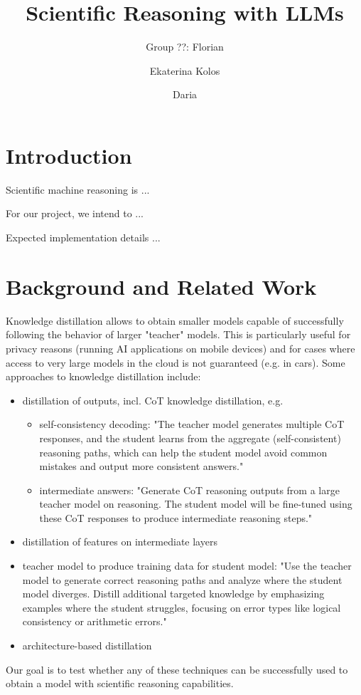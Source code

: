 \documentclass{article}
\begin{document}
\title{Scientific Reasoning with LLMs}

\author{Group ??: Florian \and Ekaterina Kolos \and Daria }

\maketitle             


\section{Introduction}

Scientific machine reasoning is ... 

For our project, we intend to ...

Expected implementation details ...

\section{Background and Related Work}

Knowledge distillation allows to obtain smaller models capable of successfully following the behavior of larger "teacher" models. This is particularly useful for privacy reasons (running AI applications on mobile devices) and for cases where access to very large models in the cloud is not guaranteed (e.g. in cars). Some approaches to knowledge distillation include: \begin{itemize}
    \item distillation of outputs, incl. CoT knowledge distillation, e.g. 
    \begin{itemize}
    \item self-consistency decoding: "The teacher model generates multiple CoT responses, and the student learns from the aggregate (self-consistent) reasoning paths, which can help the student model avoid common mistakes and output more consistent answers." 
    \item intermediate answers: "Generate CoT reasoning outputs from a large teacher model on reasoning. The student model will be fine-tuned using these CoT responses to produce intermediate reasoning steps."
    \end{itemize}
    \item distillation of features on intermediate layers 
    \item teacher model to produce training data for student model: "Use the teacher model to generate correct reasoning paths and analyze where the student model diverges. Distill additional targeted knowledge by emphasizing examples where the student struggles, focusing on error types like logical consistency or arithmetic errors."
    \item architecture-based distillation
\end{itemize}
Our goal is to test whether any of these techniques can be successfully used to obtain a model with scientific reasoning capabilities. 
\end{document}
